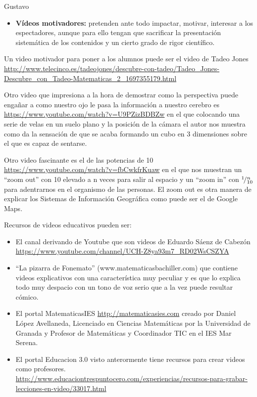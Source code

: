 \begin{opin}{\guscolor}{Gustavo}
\begin{itemize}
\item \textbf{Vídeos motivadores:} pretenden ante todo impactar, motivar, interesar a los espectadores, aunque para ello tengan que sacrificar la presentación sistemática de los contenidos y un cierto grado de rigor científico. 
\end{itemize}

Un video motivador para poner a los alumnos puede ser el video de Tadeo Jones \url{http://www.telecinco.es/tadeojones/descubre-con-tadeo/Tadeo_Jones-Descubre_con_Tadeo-Matematicas_2_1697355179.html}

Otro video que impresiona a la hora de demostrar como la perspectiva puede engañar a como nuestro ojo le pasa la información a nuestro cerebro es \url{https://www.youtube.com/watch?v=U9PZizBDBZw} en el que colocando una serie de velas en un suelo plano y la posición de la cámara el autor nos muestra como da la sensación de que se acaba formando un cubo en 3 dimensiones sobre el que es capaz de sentarse.

Otro video fascinante es el de las potencias de 10 \url{https://www.youtube.com/watch?v=fbCwkfrKuaw} en el que nos muestran un “zoom out” con 10 elevado a n veces para salir al espacio y un “zoom in” con ${}^{1}\!/_{10}^n$ para adentrarnos en el organismo de las personas. El zoom out es otra manera de explicar los Sistemas de Información Geográfica como puede ser el de Google Maps.

Recursos de videos educativos pueden ser:
\begin{itemize}
\item El canal derivando de Youtube que son videos de Eduardo Sáenz de Cabezón \url{https://www.youtube.com/channel/UCH-Z8ya93m7_RD02WsCSZYA} 

\item “La pizarra de Fonemato” (www.matematicasbachiller.com) que contiene videos explicativos con una característica muy peculiar y es que lo explica todo muy despacio con un tono de voz serio que a la vez puede resultar cómico. 

\item El portal MatematicasIES \url{http://matematicasies.com} creado por Daniel López Avellaneda, Licenciado en Ciencias Matemáticas por la Universidad de Granada y Profesor de Matemáticas y Coordinador TIC en el IES Mar Serena. 

\item El portal Educacion 3.0 visto anterormente tiene recursos para crear videos como profesores. \url{http://www.educaciontrespuntocero.com/experiencias/recursos-para-grabar-lecciones-en-video/33017.html}  


\end{itemize}
\end{opin}
